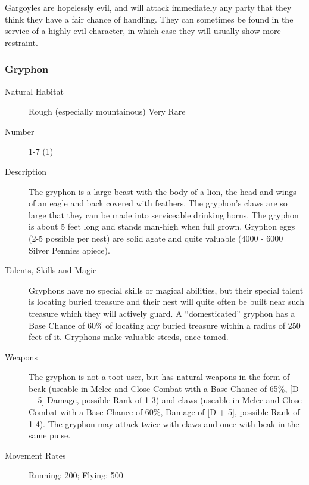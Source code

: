 \begin{multicols*}{2}
\begin{description}
\setlength\itemsep{0pt}

\item[Comments] Gargoyles are hopelessly evil, and will attack immediately
any party that they think they have a fair chance of handling. They
can sometimes be found in the service of a highly evil character, in
which case they will usually show more restraint.

\end{description}

\subsubsection{Gryphon}

\begin{description}
\item[Natural Habitat] Rough (especially mountainous) Very Rare

\item[Number] 1-7 (1)

\item[Description] The gryphon is a large beast with the body of a lion, the head
and wings of an eagle and back covered with feathers. The gryphon's
claws are so large that they can be made into serviceable drinking
horns. The gryphon is about 5 feet long and stands man-high when full
grown. Gryphon eggs (2-5 possible per nest) are solid agate and quite
valuable (4000 - 6000 Silver Pennies apiece).

\item[Talents, Skills and Magic] Gryphons have no special skills or magical abilities, but
their special talent is locating buried treasure and their nest will
quite often be built near such treasure which they will actively
guard. A ``domesticated'' gryphon has a Base Chance of 60\% of
locating any buried treasure within a radius of 250 feet of
it. Gryphons make valuable steeds, once tamed.

\item[Weapons] The gryphon is not a toot user, but has natural weapons in
the form of beak (useable in Melee and Close Combat with a Base Chance
of 65\%, [D + 5] Damage, possible Rank of 1-3) and claws (useable
in Melee and Close Combat with a Base Chance of 60\%, Damage of
[D + 5], possible Rank of 1-4). The gryphon may attack twice with
claws and once with beak in the same pulse.


\item[Movement Rates] Running: 200; Flying: 500


\end{description}
\end{multicols*}
